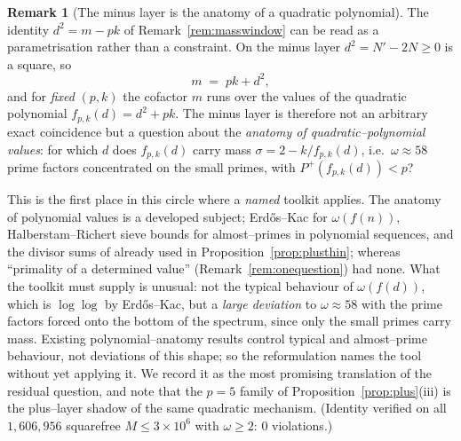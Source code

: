 \documentclass[11pt]{article}
\theoremstyle{definition}
\newtheorem{remark}[theorem]{Remark}
\begin{document}
\begin{remark}[The minus layer is the anatomy of a quadratic polynomial]\label{rem:quadratic}
The identity $d^2=m-pk$ of Remark~\ref{rem:masswindow} can be read as a parametrisation rather than a
constraint. On the minus layer $d^2=N'-2N\ge0$ is a square, so
\[ m\;=\;pk+d^2, \]
and for \emph{fixed} $(p,k)$ the cofactor $m$ runs over the values of the quadratic polynomial
$f_{p,k}(d)=d^2+pk$. The minus layer is therefore not an arbitrary exact coincidence but a question
about the \emph{anatomy of quadratic--polynomial values}: for which $d$ does $f_{p,k}(d)$ carry
mass $\sigma=2-k/f_{p,k}(d)$, i.e.\ $\omega\approx58$ prime factors concentrated on the small
primes, with $P^+(f_{p,k}(d))<p$?

This is the first place in this circle where a \emph{named} toolkit applies. The anatomy of
polynomial values is a developed subject; Erd\H{o}s--Kac for $\omega(f(n))$, Halberstam--Richert
sieve bounds for almost--primes in polynomial sequences, and the divisor sums of \cite{Erdos1952}
already used in Proposition~\ref{prop:plusthin}; whereas ``primality of a determined value''
(Remark~\ref{rem:onequestion}) had none. What the toolkit must supply is unusual: not the typical
behaviour of $\omega(f(d))$, which is $\log\log$ by Erd\H{o}s--Kac, but a \emph{large deviation} to
$\omega\approx58$ with the prime factors forced onto the bottom of the spectrum, since only the
small primes carry mass. Existing polynomial--anatomy results control typical and almost--prime
behaviour, not deviations of this shape; so the reformulation names the tool without yet applying
it. We record it as the most promising translation of the residual question, and note that the
$p=5$ family of Proposition~\ref{prop:plus}(iii) is the plus--layer shadow of the same quadratic
mechanism. (Identity verified on all $1{,}606{,}956$ squarefree $M\le3\times10^6$ with $\omega\ge2$:
$0$ violations.)
\end{remark}
\end{document}
